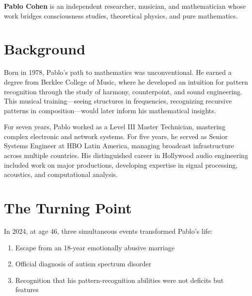 

\vspace{0.5cm}

\textbf{Pablo Cohen} is an independent researcher, musician, and mathematician whose work bridges consciousness studies, theoretical physics, and pure mathematics.

\section*{Background}

Born in 1978, Pablo's path to mathematics was unconventional. He earned a degree from Berklee College of Music, where he developed an intuition for pattern recognition through the study of harmony, counterpoint, and sound engineering. This musical training—seeing structures in frequencies, recognizing recursive patterns in composition—would later inform his mathematical insights.

For seven years, Pablo worked as a Level III Master Technician, mastering complex electronic and network systems. For five years, he served as Senior Systems Engineer at HBO Latin America, managing broadcast infrastructure across multiple countries. His distinguished career in Hollywood audio engineering included work on major productions, developing expertise in signal processing, acoustics, and computational analysis.

\section*{The Turning Point}

In 2024, at age 46, three simultaneous events transformed Pablo's life:

\begin{enumerate}
\item Escape from an 18-year emotionally abusive marriage
\item Official diagnosis of autism spectrum disorder
\item Recognition that his pattern-recognition abilities were not deficits but features
\end{enumerate}

